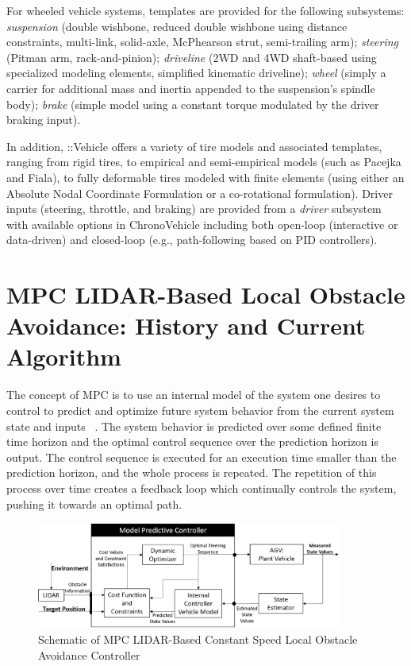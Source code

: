 \documentclass[12pt,onecolumn]{report}
\newcommand{\CHRONO}{{\sffamily{{Chrono}}}}
\newcommand{\ChronoVehicle}{{\sffamily{Chrono}}::Vehicle}
\begin{document}
For wheeled vehicle systems, templates are provided for the following subsystems:
{\em suspension} (double wishbone, reduced double wishbone using distance constraints, multi-link, solid-axle, McPhearson strut, semi-trailing arm);
{\em steering} (Pitman arm, rack-and-pinion);
{\em driveline} (2WD and 4WD shaft-based using specialized {\CHRONO} modeling elements, simplified kinematic driveline);
{\em wheel} (simply a carrier for additional mass and inertia appended to the suspension's spindle body);
{\em brake} (simple model using a constant torque modulated by the driver braking input).

In addition, {\ChronoVehicle} offers a variety of tire models and associated templates, ranging from rigid tires, to empirical and semi-empirical models (such as Pacejka and Fiala), to fully deformable tires modeled with finite elements (using either an Absolute Nodal Coordinate Formulation or a co-rotational formulation).  Driver inputs (steering, throttle, and braking) are provided from a {\em driver} subsystem with available options in {ChronoVehicle} including both open-loop (interactive or data-driven) and closed-loop (e.g., path-following based on PID controllers).


\section{MPC LIDAR-Based Local Obstacle Avoidance: History and Current Algorithm}\label{s:MPC}

The concept of MPC is to use an internal model of the system one desires to control to predict and optimize future system behavior from the current system state and inputs ~\cite{Allgower&Findeisen2002}. The system behavior is predicted over some defined finite time horizon and the optimal control sequence over the prediction horizon is output. The control sequence is executed for an execution time smaller than the prediction horizon, and the whole process is repeated. The repetition of this process over time creates a feedback loop which continually controls the system, pushing it towards an optimal path.

\begin{figure}
	\centering
	\includegraphics[width=0.9\textwidth]{Figs/MPCBlockDiagram.png}
	\caption{{\small Schematic of MPC LIDAR-Based Constant Speed Local Obstacle Avoidance Controller}}    
	\label{fig:MPC_schematic}
\end{figure}
\end{document}
